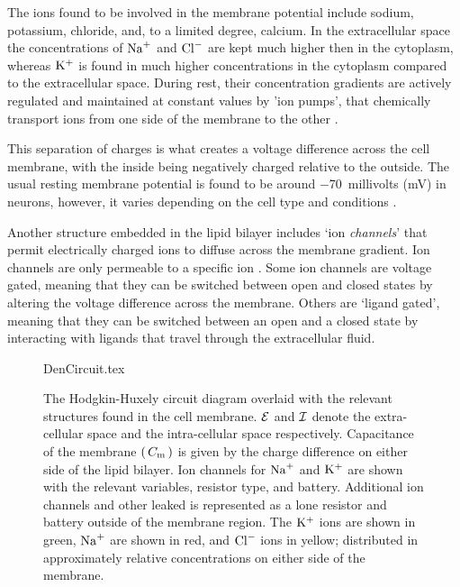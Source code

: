 \documentclass[../../Orator]{subfiles}
\begin{document}
The ions found to be involved in the membrane potential include sodium, potassium, chloride, and, to a limited degree, calcium\footnotemark. 
In the extracellular space the concentrations of \(\mathrm{Na}^+\) and  \(\mathrm{Cl}^-\) are kept much higher then in the cytoplasm, whereas \(\mathrm{K}^+\) is found in much higher concentrations  in the cytoplasm compared to the extracellular space. During rest, their concentration gradients are actively regulated and maintained at constant values by 'ion pumps', that chemically transport ions from one side of the membrane to the other \cite{}. 

This separation of charges is what creates a voltage difference across the cell membrane, with the inside being negatively charged relative to the outside. The usual resting membrane potential is found to be around \qty{-70}{millivolts} (\unit{\milli\volt}) in neurons, however, it varies depending on the cell type and conditions \cite{}. 

Another structure embedded in the lipid bilayer includes `ion \textit{channels}' that permit electrically charged ions to diffuse across the membrane gradient. Ion channels are only permeable to a specific ion \cite{}. Some ion channels are voltage gated, meaning that they can be switched between open and closed states by altering the voltage difference across the membrane. 
Others are `ligand gated', meaning that they can be switched between an open and a closed state by interacting with ligands that travel through the extracellular fluid. 

\vspace{1em}

\begin{figure}[ht]
    \centering
    {DenCircuit.tex}
    \caption{The Hodgkin-Huxely circuit diagram overlaid with the relevant structures found in the cell membrane. \(\mathcal{E}\) and \(\mathcal{I}\) denote the extra-cellular space and the intra-cellular space respectively. Capacitance of the membrane \(\left(\,C_{\mathrm{m}}\,\right)\) is given by the charge difference on either side of the lipid bilayer. Ion channels for \(\mathrm{Na}^+\) and \(\mathrm{K}^+\) are shown with the relevant variables, resistor type, and battery. Additional ion channels and other leaked is represented as a lone resistor and battery outside of the membrane region. The \(\mathrm{K}^+\) ions are shown in green, \(\mathrm{Na}^+\) are shown in red, and \(\mathrm{Cl}^-\) ions in yellow; distributed in approximately relative concentrations on either side of the membrane. }\label{fig:MembraneCircut}
\end{figure}
\end{document}
